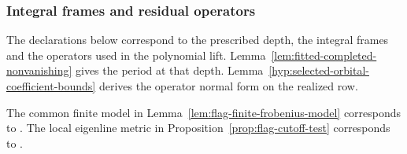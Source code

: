 \subsubsection{Integral frames and residual operators}
The declarations below correspond to the prescribed depth, the integral frames and the operators used in the polynomial lift. Lemma~\ref{lem:fitted-completed-nonvanishing} gives the period at that depth. Lemma~\ref{hyp:selected-orbital-coefficient-bounds} derives the operator normal form on the realized row.

The common finite model in Lemma~\ref{lem:flag-finite-frobenius-model} corresponds to
\href{https://github.com/Deicyde/riemann-hypothesis/blob/a172c464fd4bcfc4f53e394dcba45d742b1409a6/src/Development/AbelianVarietyTheory/Proofs/DivisorProofs/ChainCoverOfHyp.lean\#L240}{}. The local eigenline metric in Proposition~\ref{prop:flag-cutoff-test} corresponds to
\href{https://github.com/Deicyde/riemann-hypothesis/blob/a172c464fd4bcfc4f53e394dcba45d742b1409a6/src/Development/AbelianVarietyTheory/Proofs/DivisorProofs/LocalHeightPrimeComparison.lean\#L418}{}.


